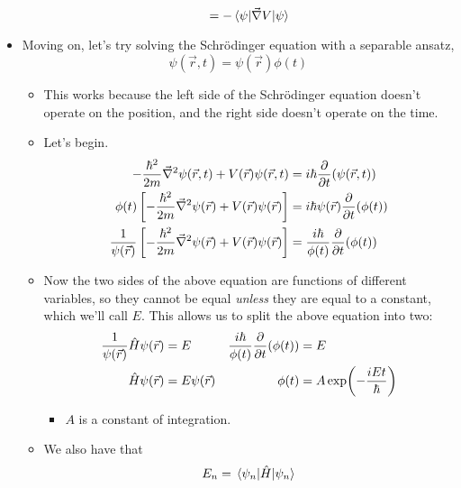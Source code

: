 \documentclass[../notes.tex]{subfiles}
\begin{document}
\begin{itemize}
\begin{itemize}
\begin{equation*}
            = -\ev{\vec{\nabla}V}{\psi}
        \end{equation*}
    \end{itemize}
    \item Moving on, let's try solving the Schr\"{o}dinger equation with a separable ansatz,
    \begin{equation*}
        \psi(\vec{r},t) = \psi(\vec{r})\phi(t)
    \end{equation*}
    \begin{itemize}
        \item This works because the left side of the Schr\"{o}dinger equation doesn't operate on the position, and the right side doesn't operate on the time.
        \item Let's begin.
        \begin{align*}
            -\frac{\hbar^2}{2m}\vec{\nabla}^2\psi(\vec{r},t)+V(\vec{r})\psi(\vec{r},t) &= i\hbar\pdv{t}(\psi(\vec{r},t))\\
            \phi(t)\left[ -\frac{\hbar^2}{2m}\vec{\nabla}^2\psi(\vec{r})+V(\vec{r})\psi(\vec{r}) \right] &= i\hbar\psi(\vec{r})\pdv{t}(\phi(t))\\
            \frac{1}{\psi(\vec{r})}\left[ -\frac{\hbar^2}{2m}\vec{\nabla}^2\psi(\vec{r})+V(\vec{r})\psi(\vec{r}) \right] &= \frac{i\hbar}{\phi(t)}\pdv{t}(\phi(t))
        \end{align*}
        \item Now the two sides of the above equation are functions of different variables, so they cannot be equal \emph{unless} they are equal to a constant, which we'll call $E$. This allows us to split the above equation into two:
        \begin{align*}
            \frac{1}{\psi(\vec{r})}\hat{H}\psi(\vec{r}) &= E&
                \frac{i\hbar}{\phi(t)}\pdv{t}(\phi(t)) &= E\\
            \hat{H}\psi(\vec{r}) &= E\psi(\vec{r})&
                \phi(t) &= A\exp(-\frac{iEt}{\hbar})
        \end{align*}
        \begin{itemize}
            \item $A$ is a constant of integration.
        \end{itemize}
        \item We also have that
        \begin{equation*}
            E_n = \ev{\hat{H}}{\psi_n}
        \end{equation*}
        \begin{itemize}

\end{itemize}
\end{itemize}
\end{itemize}
\end{document}
